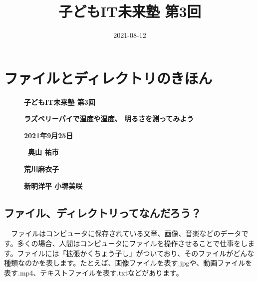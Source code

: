 \documentclass[a4paper,dvipdfmx]{jarticle}
\title{子どもIT未来塾 第3回}
\author{}
\date{2021-08-12}
\begin{document}
\clearpage\setcounter{page}{1}\pagestyle{Standard}
\thispagestyle{FirstPage}

\bigskip

\clearpage\section{ファイルとディレクトリのきほん}
\begin{figure}
\centering
\begin{minipage}{17.369cm}
\clearpage\setcounter{page}{1}\pagestyle{Standard}
\thispagestyle{FirstPage}
{\centering\bfseries
子どもIT未来塾 第3回
\par}

{\centering\bfseries
ラズベリーパイで温度や湿度、\newline
明るさを測ってみよう
\par}

{\centering\bfseries
2021年9月25日
\par}

{\centering\bfseries
\ 奥山 祐市
\par}

{\centering\bfseries
荒川麻衣子
\par}

{\centering\bfseries
新明洋平 \newline
小堺美咲
\par}
\end{minipage}
\end{figure}
\subsection{ファイル、ディレクトリってなんだろう？}
　ファイルはコンピュータに保存されている文章、画像、音楽などのデータです。多くの場合、人間はコンピュータにファイルを操作させることで仕事をします。ファイルには「拡張かくちょう子し」がついており、そのファイルがどんな種類なのかを表します。たとえば、画像ファイルを表す.jpgや、動画ファイルを表す.mp4、テキストファイルを表す.txtなどがあります。
\end{document}
